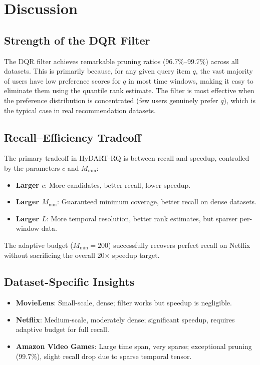 \section{Discussion}

\subsection{Strength of the DQR Filter}

The DQR filter achieves remarkable pruning ratios (96.7\%--99.7\%) across all datasets. This is primarily because, for any given query item $q$, the vast majority of users have low preference scores for $q$ in most time windows, making it easy to eliminate them using the quantile rank estimate. The filter is most effective when the preference distribution is concentrated (few users genuinely prefer $q$), which is the typical case in real recommendation datasets.

\subsection{Recall--Efficiency Tradeoff}

The primary tradeoff in HyDART-RQ is between recall and speedup, controlled by the parameters $c$ and $M_{\min}$:
\begin{itemize}
  \item \textbf{Larger $c$}: More candidates, better recall, lower speedup.
  \item \textbf{Larger $M_{\min}$}: Guaranteed minimum coverage, better recall on dense datasets.
  \item \textbf{Larger $L$}: More temporal resolution, better rank estimates, but sparser per-window data.
\end{itemize}
The adaptive budget ($M_{\min} = 200$) successfully recovers perfect recall on Netflix without sacrificing the overall 20$\times$ speedup target.

\subsection{Dataset-Specific Insights}

\begin{itemize}
  \item \textbf{MovieLens}: Small-scale, dense; filter works but speedup is negligible.
  \item \textbf{Netflix}: Medium-scale, moderately dense; significant speedup, requires adaptive budget for full recall.
  \item \textbf{Amazon Video Games}: Large time span, very sparse; exceptional pruning (99.7\%), slight recall drop due to sparse temporal tensor.
\end{itemize}

